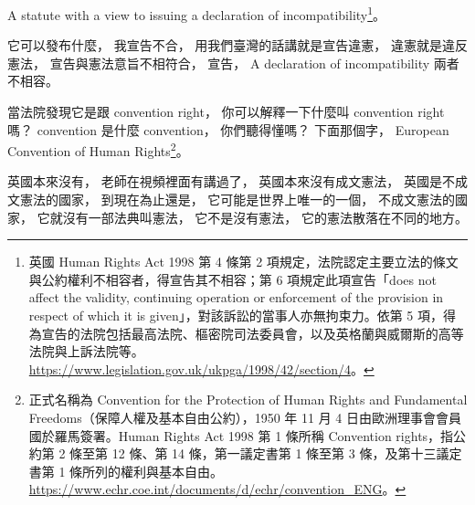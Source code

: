 \hypertarget{w06:cue:695}{}A statute with a view to issuing a declaration of incompatibility\footnote{英國 Human Rights Act 1998 第 4 條第 2 項規定，法院認定主要立法的條文與公約權利不相容者，得宣告其不相容；第 6 項規定此項宣告「does not affect the validity, continuing operation or enforcement of the provision in respect of which it is given」，對該訴訟的當事人亦無拘束力。依第 5 項，得為宣告的法院包括最高法院、樞密院司法委員會，以及英格蘭與威爾斯的高等法院與上訴法院等。\url{https://www.legislation.gov.uk/ukpga/1998/42/section/4}。}。

\hypertarget{w06:cue:696}{}它可以發布什麼，
\hypertarget{w06:cue:697}{}我宣告不合，
\hypertarget{w06:cue:698}{}用我們臺灣的話講就是宣告違憲，
\hypertarget{w06:cue:699}{}違憲就是違反憲法，
\hypertarget{w06:cue:700}{}宣告與憲法意旨不相符合，
\hypertarget{w06:cue:701}{}宣告，
\hypertarget{w06:cue:702}{}A declaration of incompatibility
\hypertarget{w06:cue:703}{}兩者不相容。

\hypertarget{w06:cue:704}{}當法院發現它是跟 convention right，
\hypertarget{w06:cue:705}{}你可以解釋一下什麼叫 convention right 嗎？
\hypertarget{w06:cue:706}{}convention 是什麼 convention，
\hypertarget{w06:cue:707}{}你們聽得懂嗎？
\hypertarget{w06:cue:708}{}下面那個字，
\hypertarget{w06:cue:709}{}European Convention of Human Rights\footnote{正式名稱為 Convention for the Protection of Human Rights and Fundamental Freedoms（保障人權及基本自由公約），1950 年 11 月 4 日由歐洲理事會會員國於羅馬簽署。Human Rights Act 1998 第 1 條所稱 Convention rights，指公約第 2 條至第 12 條、第 14 條，第一議定書第 1 條至第 3 條，及第十三議定書第 1 條所列的權利與基本自由。\url{https://www.echr.coe.int/documents/d/echr/convention_ENG}。}。

\hypertarget{w06:cue:710}{}英國本來沒有，
\hypertarget{w06:cue:711}{}老師在視頻裡面有講過了，
\hypertarget{w06:cue:712}{}英國本來沒有成文憲法，
\hypertarget{w06:cue:713}{}英國是不成文憲法的國家，
\hypertarget{w06:cue:714}{}到現在為止還是，
\hypertarget{w06:cue:715}{}它可能是世界上唯一的一個，
\hypertarget{w06:cue:716}{}不成文憲法的國家，
\hypertarget{w06:cue:717}{}它就沒有一部法典叫憲法，
\hypertarget{w06:cue:718}{}它不是沒有憲法，
\hypertarget{w06:cue:719}{}它的憲法散落在不同的地方。

